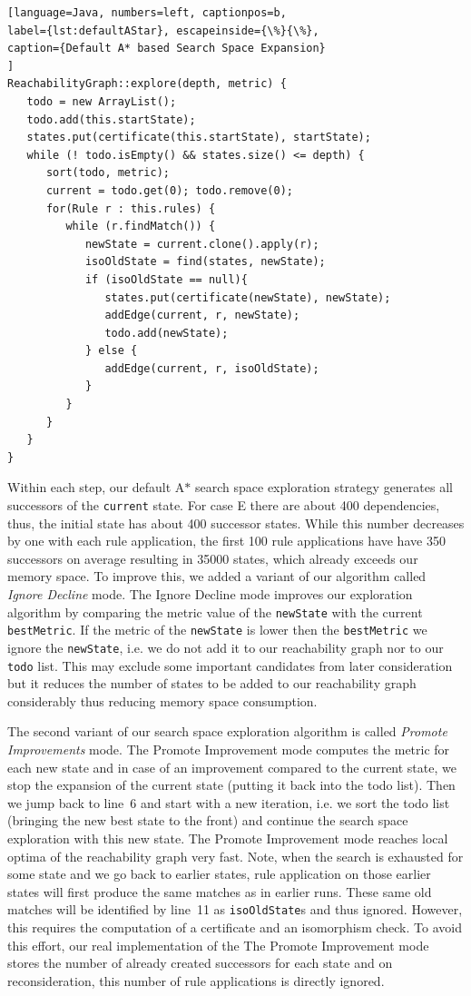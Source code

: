 \documentclass[submission,copyright,creativecommons]{eptcs}
\begin{document}
\begin{lstlisting}[language=Java, numbers=left, captionpos=b, 
label={lst:defaultAStar}, escapeinside={\%}{\%},
caption={Default A* based Search Space Expansion}
]
ReachabilityGraph::explore(depth, metric) {
   todo = new ArrayList();
   todo.add(this.startState);
   states.put(certificate(this.startState), startState);
   while (! todo.isEmpty() && states.size() <= depth) {
      sort(todo, metric);
      current = todo.get(0); todo.remove(0);
      for(Rule r : this.rules) {
         while (r.findMatch()) {
            newState = current.clone().apply(r);
            isoOldState = find(states, newState);
            if (isoOldState == null){
               states.put(certificate(newState), newState);
               addEdge(current, r, newState);
               todo.add(newState);
            } else {
               addEdge(current, r, isoOldState);
            }
         }
      }
   }
}
\end{lstlisting}


Within each step, our default A$*$ search space exploration strategy 
generates all successors of the 
\texttt{current} state. For case E there are about 400 dependencies, thus, 
the initial state has about 400 successor states. While this number decreases 
by one with each rule application, the first 100 rule applications have 
have 350 successors on average resulting in 35000 states, which already exceeds our 
memory space. To improve this, we added a variant of our algorithm called 
\emph{Ignore Decline} mode.  The Ignore Decline mode improves our 
exploration algorithm by comparing the metric value of the \texttt{newState} with 
the current \texttt{bestMetric}. If the metric of the \texttt{newState} is lower 
then the \texttt{bestMetric} we ignore the \texttt{newState}, i.e. 
we do not add it to our reachability graph nor to our \texttt{todo} list. This 
may exclude some important candidates from later consideration but it reduces the 
number of states to be added to our reachability graph considerably thus reducing 
memory space consumption.   

The second variant of our search space exploration algorithm is called 
\emph{Promote Improvements} mode.  The Promote Improvement mode computes the metric 
for each new state and in case of an improvement compared to the current state, 
we stop the expansion of the current state (putting it back into the todo list). 
Then we jump back to line~6 and start with a new iteration, i.e. we sort the todo list 
(bringing the new best state to the front) and continue the search space exploration 
with this new state.
The Promote Improvement mode reaches  
local optima of the reachability graph very fast. 
Note, when the search is exhausted for some state and we go back to earlier
states, rule application on those earlier states will first produce the same
matches as in earlier runs. These same old matches will be identified by line~11
as \texttt{isoOldState}s and thus ignored. However, this requires the computation 
of a certificate and an isomorphism check. To avoid this effort, our real 
implementation of the The Promote Improvement mode stores 
the number of already created successors
for each state and on reconsideration, this number of rule applications is directly 
ignored.  
\end{document}
